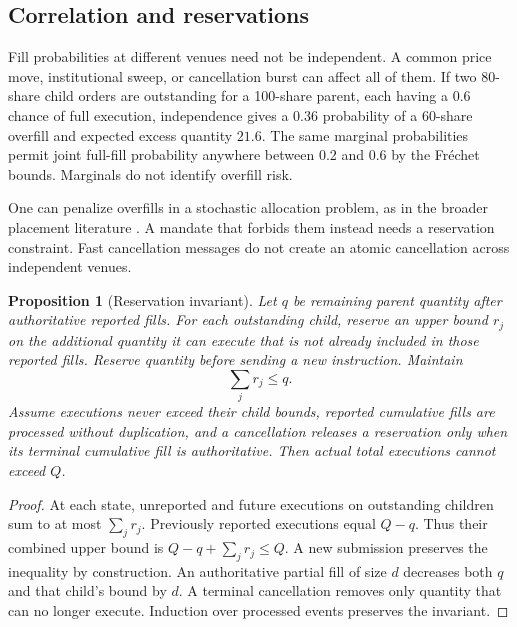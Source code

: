 \documentclass[11pt]{article}
\numberwithin{equation}{section}
\newtheorem{proposition}[theorem]{Proposition}
\theoremstyle{definition}
\theoremstyle{remark}
\theoremstyle{definition}
\begin{document}
\subsection{Correlation and reservations}

Fill probabilities at different venues need not be independent. A common
price move, institutional sweep, or cancellation burst can affect all of them.
If two 80-share child orders are outstanding for a 100-share parent, each
having a 0.6 chance of full execution, independence gives a 0.36 probability
of a 60-share overfill and expected excess quantity $21.6$. The same marginal
probabilities permit joint full-fill probability anywhere between 0.2 and 0.6
by the Fr\'echet bounds. Marginals do not identify overfill risk.

One can penalize overfills in a stochastic allocation problem, as in the
broader placement literature \citep{cont2017}. A mandate that forbids them
instead needs a reservation constraint. Fast cancellation messages do not
create an atomic cancellation across independent venues.

\begin{proposition}[Reservation invariant]\label{prop:reserve}
Let $q$ be remaining parent quantity after authoritative reported fills.
For each outstanding child, reserve an upper bound $r_j$ on the additional
quantity it can execute that is not already included in those reported fills.
Reserve quantity before sending a new instruction. Maintain
\begin{equation}\label{eq:reservation}
 \sum_jr_j\leq q.
\end{equation}
Assume executions never exceed their child bounds, reported cumulative fills
are processed without duplication, and a cancellation releases a reservation
only when its terminal cumulative fill is authoritative. Then actual total
executions cannot exceed $Q$.
\end{proposition}
\begin{proof}
At each state, unreported and future executions on outstanding children sum
to at most $\sum_jr_j$. Previously reported executions equal $Q-q$.
Thus their combined upper bound is $Q-q+\sum_jr_j\leq Q$.
A new submission preserves the inequality by construction. An authoritative
partial fill of size $d$ decreases both $q$ and that child's bound by $d$.
A terminal cancellation removes only quantity that can no longer execute.
Induction over processed events preserves the invariant.
\end{proof}
\end{document}
